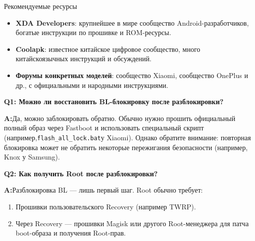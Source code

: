 \begin{tcbinfo}{Рекомендуемые ресурсы}
\begin{itemize}
  \item \textbf{XDA Developers}: крупнейшее в мире сообщество Android-разработчиков, богатые инструкции по прошивке и ROM-ресурсы.
  \item \textbf{Coolapk}: известное китайское цифровое сообщество, много китайскоязычных инструкций и обсуждений.
  \item \textbf{Форумы конкретных моделей}: сообщество Xiaomi, сообщество OnePlus и др., с официальными и народными инструкциями.
\end{itemize}

\end{tcbinfo}


\textbf{Q1: Можно ли восстановить BL-блокировку после разблокировки?}\par

\textbf{A:}Да, можно заблокировать обратно. Обычно нужно прошить официальный полный образ через Fastboot и использовать специальный скрипт (например,\texttt{flash\_all\_lock.\allowbreak bat}у Xiaomi). Однако обратите внимание: повторная блокировка может не обратить некоторые пережигания безопасности (например, Knox у Samsung).

\textbf{Q2: Как получить Root после разблокировки?}\par

\textbf{A:}Разблокировка BL — лишь первый шаг. Root обычно требует:

\begin{enumerate}
  \item Прошивки пользовательского Recovery (например TWRP).
  \item Через Recovery — прошивки Magisk или другого Root-менеджера для патча boot-образа и получения Root-прав.
\end{enumerate}
